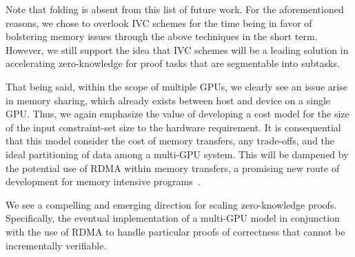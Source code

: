 \documentclass[sigconf]{acmart}
\begin{document}
Note that folding is absent from this list of future work. For the aforementioned reasons, we chose to overlook IVC schemes for the time being in favor of bolstering memory issues through the above techniques in the short term. However, we still support the idea that IVC schemes will be a leading solution in accelerating zero-knowledge for proof tasks that are segmentable into subtasks. 

That being said, within the scope of multiple GPUs, we clearly see an issue arise in memory sharing, which already exists between host and device on a single GPU. Thus, we again emphasize the value of developing a cost model for the size of the input constraint-set size to the hardware requirement. It is consequential that this model consider the cost of memory transfers, any trade-offs, and the ideal partitioning of data among a multi-GPU system. This will be dampened by the potential use of RDMA within memory transfers, a promising new route of development for memory intensive programs~\cite{GPUDirect}. 

We see a compelling and emerging direction for scaling zero-knowledge proofs. Specifically, the eventual implementation of a multi-GPU model\cite{nusratthesis} in conjunction with the use of RDMA to handle particular proofs of correctness that cannot be incrementally verifiable.

\end{document}
